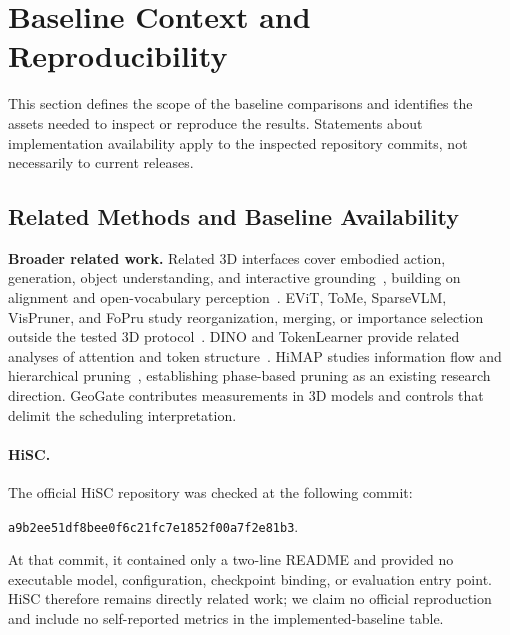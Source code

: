 \section{Baseline Context and Reproducibility}
\label{sec:supp_repro}
This section defines the scope of the baseline comparisons and identifies the assets needed to inspect or reproduce the results. Statements about implementation availability apply to the inspected repository commits, not necessarily to current releases.




\subsection{Related Methods and Baseline Availability}
\label{sec:supp_baseline_availability}

\textbf{Broader related work.} Related 3D interfaces cover embodied action, generation, object understanding, and interactive grounding~\citep{huang2024leo,zhen20243dvla, qi2024gpt4point,qi2024shapellm,chen2024ll3da,chen2024grounded3dllm}, building on alignment and open-vocabulary perception~\citep{zhou2023uni3d, xue2023ulip,peng2023openscene,jatavallabhula2023conceptfusion}. EViT, ToMe, SparseVLM, VisPruner, and FoPru study reorganization, merging, or importance selection outside the tested 3D protocol~\citep{liang2022evit, bolya2023tome,zhang2024sparsevlm,zhang2024fastervlm,jiang2024fopru}. DINO and TokenLearner provide related analyses of attention and token structure~\citep{caron2021dino,ryoo2021tokenlearner}. HiMAP studies information flow and hierarchical pruning~\citep{yin2025himap}, establishing phase-based pruning as an existing research direction. GeoGate contributes measurements in 3D models and controls that delimit the scheduling interpretation.

\paragraph{HiSC.} The official HiSC repository was checked at the following commit:
{\raggedright\par\noindent
\texttt{a9b2ee51df8bee0f6c21\allowbreak fc7e1852f00a7f2e81b3}.\par}
At that commit, it contained only a two-line README and provided no executable model, configuration, checkpoint binding, or evaluation entry point. HiSC therefore remains directly related work; we claim no official reproduction and include no self-reported metrics in the implemented-baseline table.

